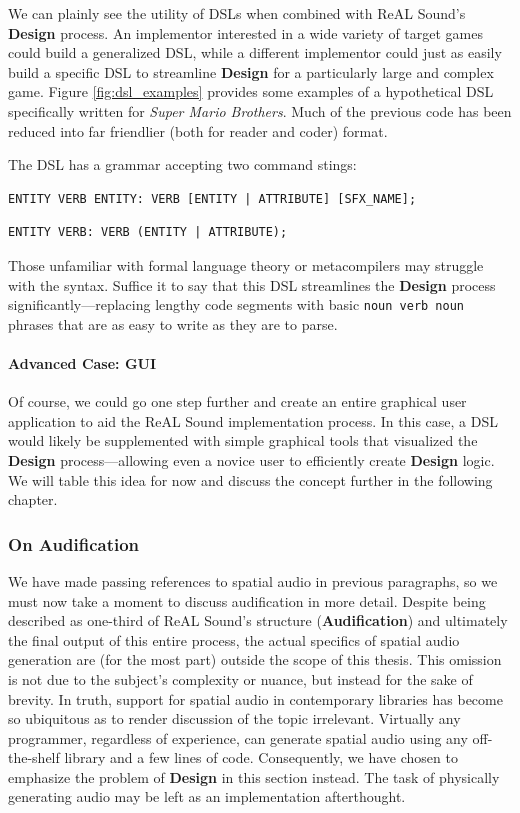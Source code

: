 \documentclass{report}
\newcommand{\rs}{ReAL Sound\xspace}
\newcommand{\design}{\textbf{Design}\xspace}
\newcommand{\audio}{\textbf{Audification}\xspace}
\newcommand{\imp}{implementor\xspace}
\begin{document}
We can plainly see the utility of DSLs when combined with \rs's \design process. An \imp interested in a wide variety of target games could build a generalized DSL, while a different \imp could just as easily build a specific DSL to streamline \design for a particularly large and complex game. Figure \ref{fig:dsl_examples} provides some examples of a hypothetical DSL specifically written for \emph{Super Mario Brothers}. Much of the previous code has been reduced into far friendlier (both for reader and coder) format. 

The DSL has a grammar accepting two command stings:

\vspace{8pt}

\begin{lstlisting}[frame=single, basicstyle=\small]
    ENTITY VERB ENTITY: VERB [ENTITY | ATTRIBUTE] [SFX_NAME];
\end{lstlisting}

\begin{lstlisting}[frame=single]
    ENTITY VERB: VERB (ENTITY | ATTRIBUTE);
\end{lstlisting}

\vspace{8pt}
Those unfamiliar with formal language theory or metacompilers may struggle with the syntax. Suffice it to say that this DSL streamlines the \design process significantly---replacing lengthy code segments with basic \texttt{noun verb noun} phrases that are as easy to write as they are to parse.

\paragraph{Advanced Case: GUI}
Of course, we could go one step further and create an entire graphical user application to aid the \rs implementation process. In this case, a DSL would likely be supplemented with simple graphical tools that visualized the \design process---allowing even a novice user to efficiently create \design logic. We will table this idea for now and discuss the concept further in the following chapter.  

\subsubsection{On Audification}
We have made passing references to spatial audio in previous paragraphs, so we must now take a moment to discuss audification in more detail. Despite being described as one-third of \rs's structure (\audio) and ultimately the final output of this entire process, the actual specifics of spatial audio generation are (for the most part) outside the scope of this thesis. This omission is not due to the subject's complexity or nuance, but instead for the sake of brevity. In truth, support for spatial audio in contemporary libraries has become so ubiquitous as to render discussion of the topic irrelevant. Virtually any programmer, regardless of experience, can generate spatial audio using any off-the-shelf library and a few lines of code. Consequently, we have chosen to emphasize the problem of \design in this section instead. The task of physically generating audio may be left as an implementation afterthought. 
\end{document}
